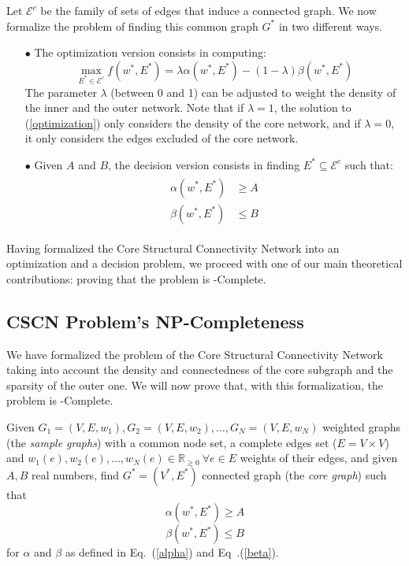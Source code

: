 Let $\mathcal{E}^{c}$ be the family of sets of edges that induce a connected graph. We now formalize the problem of finding this common graph $G^*$ in two different ways.
\begin{itemize}
\item[$\bullet$] The optimization version consists in computing:
\begin{equation}\label{optimization}
\max_{E^{*} \in \mathcal{E}^{c}} f(w^*, E^*) = \lambda \alpha(w^*, E^*) - (1-\lambda) \beta(w^*, E^*)
\end{equation}
The parameter $\lambda$ (between 0 and 1) can be adjusted to weight the density of the inner and the outer network. Note that if $\lambda = 1$, the solution to (\ref{optimization}) only considers the density of the core network, and if $\lambda = 0$, it only considers the edges excluded of the core network.

\item[$\bullet$] Given $A$ and $B$, the decision version consists in finding $E^* \subseteq \mathcal{E}^{c}$ such that:
\begin{align}
\begin{split}\label{decision}
\alpha(w^*, E^*) &\geq A\\
\beta(w^*, E^*) &\leq B
\end{split}
\end{align}

\end{itemize}

Having formalized the Core Structural Connectivity Network into an optimization and a decision problem, we proceed with one of our main theoretical contributions: proving that the problem is \NP-Complete.

\subsection{CSCN Problem's NP-Completeness}
We have formalized the problem of the Core Structural Connectivity Network taking into account the density and connectedness of the core subgraph and the sparsity of the outer one. We will now prove that, with this formalization, the problem is \NP-Complete.

\begin{definition}
Given $G_1 = (V, E, w_1), G_2 = (V, E, w_2), \ldots, G_N = (V, E, w_N)$ weighted graphs (the \emph{sample graphs}) with a common node set, a complete edges set ($E = V \times V$) and $w_1(e), w_2(e), \ldots, w_N(e) \in \mathbb{R}_{\geq0} ~ \forall e \in E$ weights of their edges, and given $A, B$ real numbers, find $G^* = (V^*, E^*)$ connected graph (the \emph{core graph}) such that
$$\alpha(w^*, E^*) \geq A$$
$$\beta(w^*, E^*) \leq B$$
for $\alpha$ and $\beta$ as defined in Eq.~(\ref{alpha}) and Eq~.(\ref{beta}).
\end{definition}

